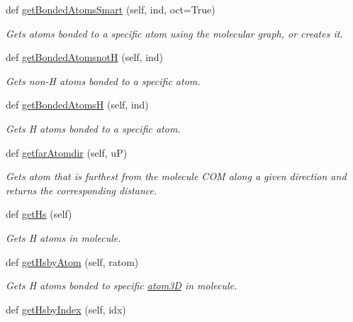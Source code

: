 \begin{DoxyCompactItemize}
def \hyperlink{classmolSimplify_1_1Classes_1_1mol3D_1_1mol3D_ae7410bc8f46e8d0d3ab6ba5baa5cdb5c}{get\+Bonded\+Atoms\+Smart} (self, ind, oct=True)
\begin{DoxyCompactList}\small\item\em Gets atoms bonded to a specific atom using the molecular graph, or creates it. \end{DoxyCompactList}\item 
def \hyperlink{classmolSimplify_1_1Classes_1_1mol3D_1_1mol3D_acda82e48cde5996f32a55e0acbdf052e}{get\+Bonded\+AtomsnotH} (self, ind)
\begin{DoxyCompactList}\small\item\em Gets non-\/H atoms bonded to a specific atom. \end{DoxyCompactList}\item 
def \hyperlink{classmolSimplify_1_1Classes_1_1mol3D_1_1mol3D_ac8ef262050d0ef901688e7c282448fa6}{get\+Bonded\+AtomsH} (self, ind)
\begin{DoxyCompactList}\small\item\em Gets H atoms bonded to a specific atom. \end{DoxyCompactList}\item 
def \hyperlink{classmolSimplify_1_1Classes_1_1mol3D_1_1mol3D_ae4d631214022274b00b853768706d55a}{getfar\+Atomdir} (self, uP)
\begin{DoxyCompactList}\small\item\em Gets atom that is furthest from the molecule C\+OM along a given direction and returns the corresponding distance. \end{DoxyCompactList}\item 
def \hyperlink{classmolSimplify_1_1Classes_1_1mol3D_1_1mol3D_a5b27778bb5e730b3911e0fe9192a4c0e}{get\+Hs} (self)
\begin{DoxyCompactList}\small\item\em Gets H atoms in molecule. \end{DoxyCompactList}\item 
def \hyperlink{classmolSimplify_1_1Classes_1_1mol3D_1_1mol3D_a232adbbe11745aac4561a15fe1850df4}{get\+Hsby\+Atom} (self, ratom)
\begin{DoxyCompactList}\small\item\em Gets H atoms bonded to specific \hyperlink{namespacemolSimplify_1_1Classes_1_1atom3D}{atom3D} in molecule. \end{DoxyCompactList}\item 
def \hyperlink{classmolSimplify_1_1Classes_1_1mol3D_1_1mol3D_a99730d5cf790e512a55fbe0d1fd863c7}{get\+Hsby\+Index} (self, idx)

\end{DoxyCompactItemize}
